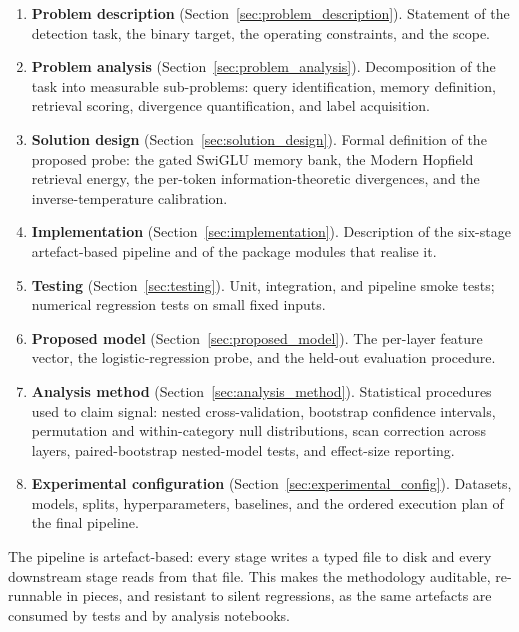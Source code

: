 \begin{enumerate}[leftmargin=*]
    \item \textbf{Problem description}
        (Section~\ref{sec:problem_description}).
        Statement of the detection task, the binary target, the operating
        constraints, and the scope.
    \item \textbf{Problem analysis}
        (Section~\ref{sec:problem_analysis}).
        Decomposition of the task into measurable sub-problems: query
        identification, memory definition, retrieval scoring, divergence
        quantification, and label acquisition.
    \item \textbf{Solution design}
        (Section~\ref{sec:solution_design}).
        Formal definition of the proposed probe: the gated SwiGLU memory
        bank, the Modern Hopfield retrieval energy, the per-token
        information-theoretic divergences, and the inverse-temperature
        calibration.
    \item \textbf{Implementation}
        (Section~\ref{sec:implementation}).
        Description of the six-stage artefact-based pipeline and of the
        package modules that realise it.
    \item \textbf{Testing}
        (Section~\ref{sec:testing}).
        Unit, integration, and pipeline smoke tests; numerical
        regression tests on small fixed inputs.
    \item \textbf{Proposed model}
        (Section~\ref{sec:proposed_model}).
        The per-layer feature vector, the logistic-regression probe, and
        the held-out evaluation procedure.
    \item \textbf{Analysis method}
        (Section~\ref{sec:analysis_method}).
        Statistical procedures used to claim signal: nested
        cross-validation, bootstrap confidence intervals, permutation and
        within-category null distributions, scan correction across layers,
        paired-bootstrap nested-model tests, and effect-size reporting.
    \item \textbf{Experimental configuration}
        (Section~\ref{sec:experimental_config}).
        Datasets, models, splits, hyperparameters, baselines, and the
        ordered execution plan of the final pipeline.
\end{enumerate}

The pipeline is artefact-based: every stage writes a typed file to disk and
every downstream stage reads from that file. This makes the methodology
auditable, re-runnable in pieces, and resistant to silent regressions, as
the same artefacts are consumed by tests and by analysis notebooks.

